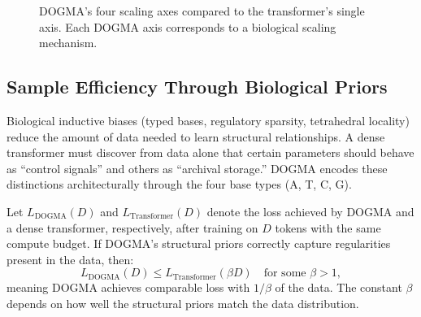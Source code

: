 \begin{figure}[H]
\centering
{}
\caption{DOGMA's four scaling axes compared to the transformer's single axis. Each DOGMA axis corresponds to a biological scaling mechanism.}
\label{fig:four-axes}
\end{figure}

\subsection{Sample Efficiency Through Biological Priors}

Biological inductive biases (typed bases, regulatory sparsity, tetrahedral locality) reduce the amount of data needed to learn structural relationships. A dense transformer must discover from data alone that certain parameters should behave as ``control signals'' and others as ``archival storage.'' DOGMA encodes these distinctions architecturally through the four base types (\textsf{A}, \textsf{T}, \textsf{C}, \textsf{G}).

\begin{proposition}
Let $L_{\text{DOGMA}}(D)$ and $L_{\text{Transformer}}(D)$ denote the loss achieved by DOGMA and a dense transformer, respectively, after training on $D$ tokens with the same compute budget. If DOGMA's structural priors correctly capture regularities present in the data, then:
\begin{equation}
L_{\text{DOGMA}}(D) \leq L_{\text{Transformer}}(\beta D) \quad \text{for some } \beta > 1,
\end{equation}
meaning DOGMA achieves comparable loss with $1/\beta$ of the data. The constant $\beta$ depends on how well the structural priors match the data distribution.
\end{proposition}

